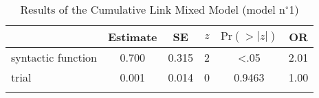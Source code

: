 \begin{table}
\begin{tabularx}{\textwidth}{Q S[table-format=-1.3] S[table-format=1.3] S[table-format=-1] S[table-format=<1.4] S[table-format=1.2]}
  \lsptoprule
 & {Estimate} & {SE} & {$z$} & {$\text{Pr}(>|z|)$} & {OR} \\ 
  \midrule
  syntactic function & 0.700 & 0.315 & 2 & <.05 & 2.01 \\ 
  trial & 0.001 & 0.014 & 0 & 0.9463 & 1.00 \\ 
   \lspbottomrule
\end{tabularx}
\caption{Results of the Cumulative Link Mixed Model (model n$^{\circ}$1)}
\label{tab:exp14-m1}
\end{table}
